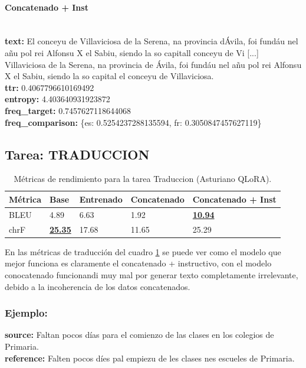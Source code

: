 \paragraph{Concatenado + Inst}~\\
\textbf{text:} El conceyu de Villaviciosa de la Serena, na provincia d\textquotesingle{}Ávila, foi fundáu nel añu pol rei Alfonsu X el Sabiu, siendo la so capital\textquotesingle{}l conceyu de Vi [...]  Villaviciosa de la Serena, na provincia de Ávila, foi fundáu nel añu pol rei Alfonsu X el Sabiu, siendo la so capital el conceyu de Villaviciosa.\\
\textbf{ttr:} 0.4067796610169492\\
\textbf{entropy:} 4.403640931923872\\
\textbf{freq\_target:} 0.7457627118644068\\
\textbf{freq\_comparison:} \{\textquotesingle{}es\textquotesingle{}: 0.5254237288135594, \textquotesingle{}fr\textquotesingle{}: 0.3050847457627119\}

\subsection{Tarea: TRADUCCION}\label{tarea-traduccion}
\begin{longtable}[]{@{}lllll@{}}
\toprule\noalign{}
Métrica & Base & Entrenado & Concatenado & Concatenado + Inst \\
\midrule\noalign{}
\endhead
\bottomrule\noalign{}
\caption{Métricas de rendimiento para la tarea Traduccion (Asturiano QLoRA).}
\label{tab:metricas_traduccion_Asturiano QLoRA}
\endlastfoot
BLEU & 4.89 & 6.63 & 1.92 & \textbf{\underline{10.94}} \\
chrF & \textbf{\underline{25.35}} & 17.68 & 11.65 & 25.29 \\
\end{longtable}

En las métricas de traducción del cuadro \ref{tab:metricas_traduccion_Asturiano QLoRA} se puede ver como el modelo que mejor funciona es claramente el concatenado + instructivo, con el modelo conocatenado funcionandi muy mal por generar texto completamente irrelevante, debido a la incoherencia de los datos concatenados. 

\subsubsection{Ejemplo:}
\textbf{source:} Faltan pocos días para el comienzo de las clases en los colegios de Primaria.\\
\textbf{reference:} Falten pocos díes pal empiezu de les clases nes escueles de Primaria.

